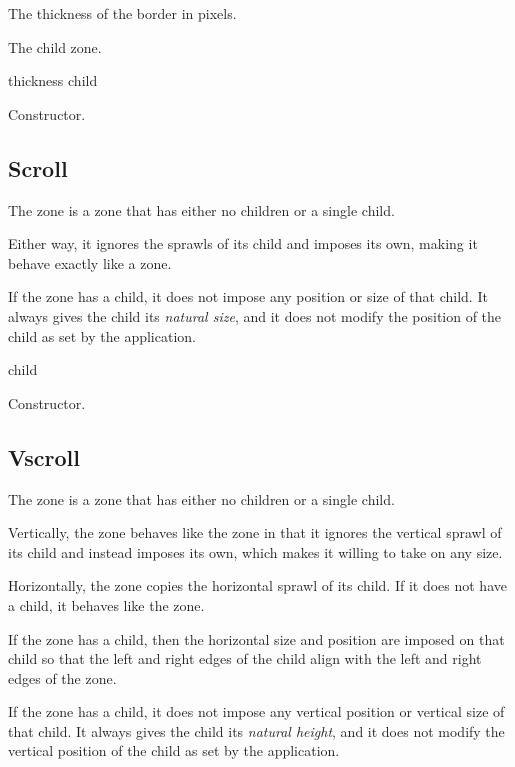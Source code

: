 

The thickness of the border in pixels.  


The child zone.

 {thickness child}

Constructor.

\subsection{Scroll}

The  zone is a zone that has either no children or a single
child.  

Either way, it ignores the sprawls of its child and imposes its own,
making it behave exactly like a  zone.  

If the  zone has a child, it does not impose any position
or size of that child.  It always gives the child its \emph{natural
  size}, and it does not modify the position of the child as set by
the application.



 {\optional child}

Constructor. 

\subsection{Vscroll}

The  zone is a zone that has either no children or a single
child.  

Vertically, the  zone behaves like the 
zone in that it ignores the vertical sprawl of its child and instead
imposes its own, which makes it willing to take on any size.  

Horizontally, the  zone copies the horizontal sprawl of
its child.  If it does not have a child, it behaves like the
 zone.  

If the  zone has a child, then the horizontal size and
position are imposed on that child so that the left and right edges of
the child align with the left and right edges of the 
zone.  

If the  zone has a child, it does not impose any vertical
position or vertical size of that child.  It always gives the child
its \emph{natural height}, and it does not modify the vertical
position of the child as set by the application.

